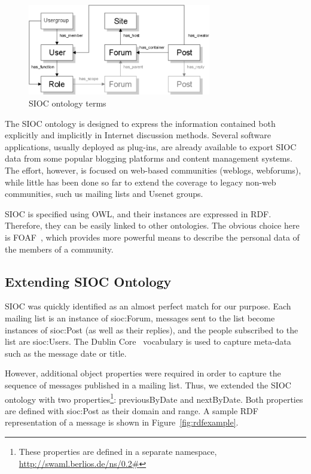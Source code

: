 \documentclass{llncs}
\begin{document}
\begin{figure}[ht]
 \centering
 \includegraphics[width=8cm]{images/sioc-terms.png}
 \caption{SIOC ontology terms}
\end{figure}

The SIOC ontology is designed to express the information contained
both explicitly  and implicitly in Internet discussion methods. Several 
software applications, usually deployed as plug-ins, are already available 
to export SIOC data from some popular blogging platforms and content 
management systems. The effort, however, is focused on web-based communities 
(weblogs, webforums), while little has been done so far to extend the coverage 
to legacy non-web communities, such us mailing lists and Usenet groups.

SIOC is specified using OWL, and their instances are expressed
in RDF. Therefore, they can be easily linked to other ontologies.
The obvious choice here is FOAF~\cite{FOAF}, which provides more
powerful means to describe the personal data of the members of
a community.

\subsection{Extending SIOC Ontology}

SIOC was quickly identified as an almost perfect match for our
purpose. Each mailing list is an instance of \textsf{sioc:Forum},
messages sent to the list become instances of \textsf{sioc:Post}
(as well as their replies), and the people subscribed to the
list are \textsf{sioc:User}s. The Dublin Core~\cite{DublinCore}
vocabulary is used to capture meta-data such as the message
date or title.

However, additional object properties were required
in order to capture the sequence of messages published in a
mailing list. Thus, we extended the SIOC ontology with two
properties\footnote{These properties are defined in a separate
namespace, \url{http://swaml.berlios.de/ns/0.2\#}}:
\textsf{previousByDate} and \textsf{nextByDate}. Both properties
are defined with \textsf{sioc:Post} as their domain and range.
A sample RDF representation of a message is shown in
Figure~\ref{fig:rdfexample}.
\end{document}
